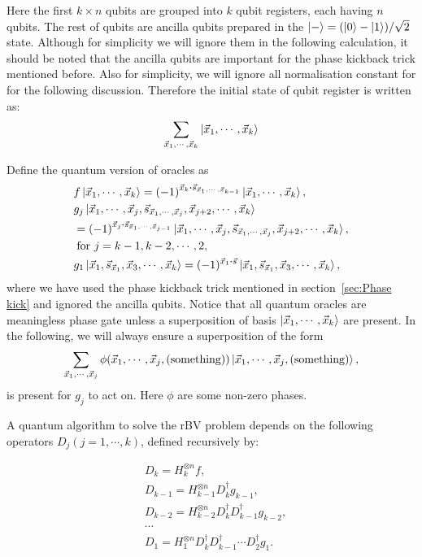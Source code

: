 \documentclass{article}
\begin{document}
Here the first $k\times n$ qubits are grouped into $k$ qubit registers, each
having $n$ qubits. The rest of qubits are ancilla qubits prepared in the
$\ket{-} = (\ket{0}-\ket{1})/\sqrt{2} $ state. Although for simplicity we will
ignore them in the following calculation, it should be noted that the ancilla
qubits are important for the phase kickback trick mentioned before. Also for
simplicity, we will ignore all normalisation constant for for the following
discussion. Therefore the initial state of qubit register is written as:
\begin{equation}
  \sum_{\vec{x}_1,\cdots,\vec{x}_{k}} \ket{\vec{x}_1,\cdots,\vec{x}_k}
\end{equation}

Define the quantum version of oracles as
\begin{align}
  & f\ket{\vec{x}_1,\cdots,\vec{x}_k} =
  (-1)^{\vec{x}_k\vdot\vec{s}_{\vec{x}_1,\cdots,\vec{x}_{k-1}}} 
  \ket{\vec{x}_1,\cdots,\vec{x}_k},\\
  & g_j \ket{\vec{x}_1,\cdots, \vec{x}_j, 
  \vec{s}_{\vec{x}_1,\cdots,\vec{x}_j} ,\vec{x}_{j+2},\cdots,\vec{x}_k}\nonumber\\
  & = (-1)^{\vec{x}_j \vdot \vec{s}_{\vec{x}_1,\cdots,\vec{x}_{j-1}}}
    \ket{\vec{x}_1,\cdots, \vec{x}_j, 
    \vec{s}_{\vec{x}_1,\cdots,\vec{x}_j} ,\vec{x}_{j+2},\cdots,\vec{x}_k},\nonumber\\
  & \;\text{for } j=k-1,k-2,\cdots ,2,\\
  & g_1 \ket{\vec{x}_1, \vec{s}_{\vec{x}_1}, \vec{x}_3, \cdots,\vec{x}_k} =
  (-1)^{\vec{x}_1 \vdot \vec{s}} \ket{\vec{x}_1, \vec{s}_{\vec{x}_1}, \vec{x}_3, \cdots,\vec{x}_k},
\end{align}
where we have used the phase kickback trick mentioned in section~\ref{sec:Phase
kick} and ignored the ancilla qubits. Notice that all quantum oracles are
meaningless phase gate unless a superposition of basis
$\ket{\vec{x}_1,\cdots,\vec{x}_k}$ are present. In the following, we will always
ensure a superposition of the form 
\[
  \sum_{\vec{x}_1,\cdots,\vec{x}_j} \phi(\vec{x}_1,\cdots,\vec{x}_j,\text{(something)})
  \ket{\vec{x}_1,\cdots,\vec{x}_j,\text{(something)}},
\]
is present for $g_j$ to act on. Here $\phi$ are some non-zero phases.

A quantum algorithm to solve the rBV problem depends on the following operators
$D_j(j=1,\cdots,k)$, defined recursively by:

\begin{align}
  &D_k = H^{\otimes n}_{k} f, \\
  &D_{k-1} = H^{\otimes n}_{k-1} D^\dagger_k g_{k-1}, \\
  &D_{k-2} = H^{\otimes n}_{k-2} D^\dagger_k D^\dagger_{k-1} g_{k-2}, \\
  &\cdots \\
  &D_1 = H^{\otimes n}_1 D^\dagger_k D^\dagger_{k-1}\cdots D^\dagger_2 g_1.
\end{align}
\end{document}
